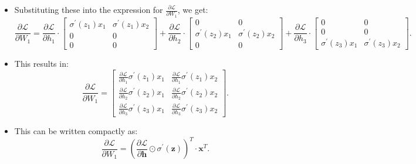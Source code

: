 \begin{notechapter}
\begin{itemize}
\begin{itemize}
\[\begin{bmatrix}
        \end{bmatrix}.
        \]
        \item Substituting these into the expression for 
        \( \frac{\partial \mathcal{L}}{\partial W_1} \), we get:
        \[
        \frac{\partial \mathcal{L}}{\partial W_1} = 
        \frac{\partial \mathcal{L}}{\partial h_1} \cdot 
        \begin{bmatrix}
        \sigma^{\prime}(z_1) x_1 & \sigma^{\prime}(z_1) x_2 \\
        0 & 0 \\
        0 & 0
        \end{bmatrix} + 
        \frac{\partial \mathcal{L}}{\partial h_2} \cdot 
        \begin{bmatrix}
        0 & 0 \\
        \sigma^{\prime}(z_2) x_1 & \sigma^{\prime}(z_2) x_2 \\
        0 & 0
        \end{bmatrix} + 
        \frac{\partial \mathcal{L}}{\partial h_3} \cdot 
        \begin{bmatrix}
        0 & 0 \\
        0 & 0 \\
        \sigma^{\prime}(z_3) x_1 & \sigma^{\prime}(z_3) x_2
        \end{bmatrix}.
        \]
        \item This results in:
        \[
        \frac{\partial \mathcal{L}}{\partial W_1} = 
        \begin{bmatrix}
        \frac{\partial \mathcal{L}}{\partial h_1} \sigma^{\prime}(z_1) x_1 & 
        \frac{\partial \mathcal{L}}{\partial h_1} \sigma^{\prime}(z_1) x_2 \\
        \frac{\partial \mathcal{L}}{\partial h_2} \sigma^{\prime}(z_2) x_1 & 
        \frac{\partial \mathcal{L}}{\partial h_2} \sigma^{\prime}(z_2) x_2 \\
        \frac{\partial \mathcal{L}}{\partial h_3} \sigma^{\prime}(z_3) x_1 & 
        \frac{\partial \mathcal{L}}{\partial h_3} \sigma^{\prime}(z_3) x_2
        \end{bmatrix}.
        \]
        \item This can be written compactly as:
        \[
        \frac{\partial \mathcal{L}}{\partial W_1} = 
        \left( \frac{\partial \mathcal{L}}{\partial \mathbf{h}} 
        \odot \sigma^{\prime}(\mathbf{z}) \right)^T \cdot \mathbf{x}^T.
        \]
    \end{itemize}


\end{itemize}
\end{notechapter}

